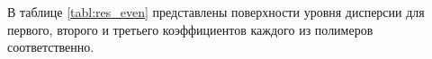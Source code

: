 \documentclass[12pt,a4paper]{article}
\theoremstyle{definition}
\begin{document}

В таблице \ref{tabl:res_even} представлены
поверхности уровня дисперсии для первого, второго и третьего коэффициентов каждого из полимеров
соответственно.
\end{document}
